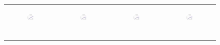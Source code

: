\begin{figure}[ht]
\begin{tabular}{cccc}
	  \begin{subfigure}[b]{0.22\textwidth}
	  	\includegraphics[width=110pt]{images/speedup_friendster10M_setcover.pdf}
			\caption{}
			\label{appfig:speedup_friendster10M_setcover}
	  \end{subfigure} &
	  \begin{subfigure}[b]{0.22\textwidth}
	  	\includegraphics[width=110pt]{images/speedup_arabic2005_setcover.pdf}
			\caption{}
			\label{appfig:speedup_arabic2005_setcover}
	  \end{subfigure} &
	  \begin{subfigure}[b]{0.22\textwidth}
	  	\includegraphics[width=110pt]{images/speedup_uk2005_setcover.pdf}
			\caption{}
			\label{appfig:speedup_uk2005_setcover}
	  \end{subfigure} &
	  \begin{subfigure}[b]{0.22\textwidth}
	  	\includegraphics[width=110pt]{images/speedup_it2004_setcover.pdf}
			\caption{}
			\label{appfig:speedup_it2004_setcover}
	  \end{subfigure} \\
	  \begin{subfigure}[b]{0.22\textwidth}

\end{subfigure}
\end{tabular}
\end{figure}
